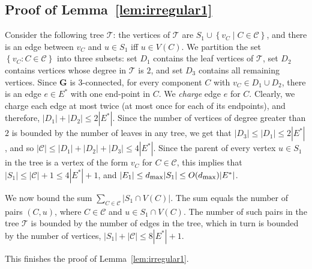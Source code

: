 \documentclass[twoside,leqno,twocolumn]{article}
\newcommand{\set}[1]{\left\{ #1 \right\}}
\newcommand{\tset}{{\mathcal T}}
\newcommand{\cset}{{\mathcal{C}}}
\newcommand{\dmax}{d_{\mbox{\textup{\footnotesize{max}}}}}
\newcommand{\G}{{\mathbf{G}}}
\renewcommand{\H}{{\mathbf{H}}}
\begin{document}
\subsection{Proof of Lemma~\ref{lem:irregular1}}\label{subsec:lemma1}
Consider the following tree $\tset$: the vertices of $\tset$ are $S_1\cup\set{v_C\mid C\in \cset}$, and there is an edge between $v_C$ and $u\in S_1$ iff $u\in V(C)$.
We partition the set $\set{v_C:C\in \cset}$ into three subsets: set $D_1$ contains the leaf vertices of $\tset$, set $D_2$ contains vertices whose degree in $\tset$ is $2$, and set $D_3$ contains all remaining vertices.
Since $\G$ is 3-connected, for every component $C$ with $v_C\in D_1\cup D_2$, there is an edge $e\in E^*$ with 
one end-point in $C$. We \textit{charge} edge $e$ for $C$. 
Clearly, we charge each edge at most twice (at most once for each of its endpoints), and
therefore, $|D_1|+|D_2| \leq 2|E^*|$. Since the number of vertices of degree greater than $2$ is bounded by the number of leaves in any tree, we get that $|D_3|\leq |D_1|\leq 2|E^*|$, and so $|\cset|\leq |D_1|+|D_2|+|D_3|\leq 4|E^*|$.  Since the parent of every vertex $u\in S_1$ in the tree is a vertex of the form $v_C$ for $C\in \cset$, this implies that $|S_1|\leq |\cset|+1\leq 4|E^*|+1$, and $|E_1|\leq \dmax|S_1|\leq O(\dmax)|E^*|$.

We now bound the sum $\sum_{C\in \cset} |S_1 \cap V(C)|$. The sum equals the number of pairs $(C,u)$, where $C\in\cset$ and $u\in S_1\cap V(C)$. The number of such pairs in the tree $\tset$ is bounded by the number of edges in the tree, which in turn is bounded by the number of vertices, $|S_1|+|\cset|\leq 8|E^*|+1$.
\iffalse
Denote the number of two connected
components in $\H$ by $m$. Then $\cal T$ has $m + |S_1|$ vertices, and, therefore,
$m + |S_1| - 1$ edges. On the other hand, there are $m - |{\cal C}|$ components
that have degree at least $3$ in ${\cal T}$. Thus ${\cal T}$ has at least $3(m - |{\cal C}|)$
edges. Since every 1-separator separates at least two connected components,
the number of edges is at least $2|S_1|$.
We get that 
$m + |S_1| - 1 \geq 3(m - |{\cal C}|)$ and
$m + |S_1| - 1 \geq 2|S_1|$. Therefore, 
$m < (|S_1| + 3|{\cal C}|)/2$ and $|S_1| < m$. So $|S_1| < 3{\cal C} \leq 6|E^*|$.

Since every edge in $E_1$ is incident to a vertex from $S_1$ in $\H$,
$|E_1| \leq 6\dmax \cdot |E^*|$. The sum $\sum_{C\in \cset} |S_1 \cap V(C)|$ equals
the number of pairs $(C, u)$, where $C$ is a connected component of $\H$ and 
$u\in S_1\cap C$, which in turn equals the number of edges in $\cal T$, which is less than $m + |S_1| \leq 12|E^*|$.
\fi
This finishes the proof of Lemma~\ref{lem:irregular1}.
\end{document}
